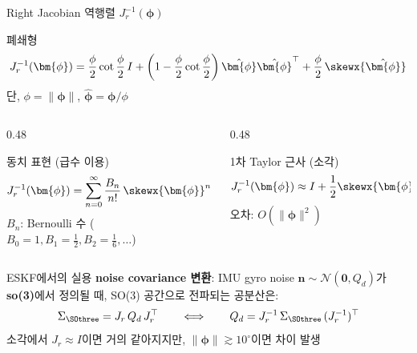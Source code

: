 \begin{frame}[shrink=5]{Right Jacobian 역행렬 $J_r^{-1}(\bm{\phi})$}
  \begin{block}{폐쇄형}
    \[
      J_r^{-1}(\bm{\phi}) = \frac{\phi}{2}\cot\frac{\phi}{2}\,I
      + \left(1 - \frac{\phi}{2}\cot\frac{\phi}{2}\right)\hat{\bm{\phi}}\hat{\bm{\phi}}^\top
      + \frac{\phi}{2}\,\skewx{\hat{\bm{\phi}}}
    \]
    단, $\phi = \|\bm{\phi}\|$, $\hat{\bm{\phi}} = \bm{\phi}/\phi$
  \end{block}
  \pause
  \begin{columns}[T]
    \begin{column}{0.48\textwidth}
      \begin{block}{동치 표현 (급수 이용)}
        \[
          J_r^{-1}(\bm{\phi}) = \sum_{n=0}^{\infty} \frac{B_n}{n!}\,\skewx{\bm{\phi}}^n
        \]
        $B_n$: Bernoulli 수 ($B_0=1, B_1=\tfrac{1}{2}, B_2=\tfrac{1}{6}, \ldots$)
      \end{block}
    \end{column}
    \begin{column}{0.48\textwidth}
      \begin{block}{1차 Taylor 근사 (소각)}
        \[
          J_r^{-1}(\bm{\phi}) \approx I + \frac{1}{2}\skewx{\bm{\phi}}
        \]
        오차: $O(\|\bm{\phi}\|^2)$
      \end{block}
    \end{column}
  \end{columns}
  \pause
  \vspace{0.5em}
  \begin{alertblock}{ESKF에서의 실용}
    \textbf{noise covariance 변환}: IMU gyro noise $\bm{n} \sim \mathcal{N}(\bm{0}, Q_d)$가
    \textbf{so(3)}에서 정의될 때, SO(3) 공간으로 전파되는 공분산은:
    \[
      \Sigma_{\SOthree} = J_r\,Q_d\,J_r^\top
      \qquad\Longleftrightarrow\qquad
      Q_d = J_r^{-1}\,\Sigma_{\SOthree}\,(J_r^{-1})^\top
    \]
    소각에서 $J_r \approx I$이면 거의 같아지지만, $\|\bm{\phi}\| \gtrsim 10^\circ$이면 차이 발생
  \end{alertblock}
\end{frame}


